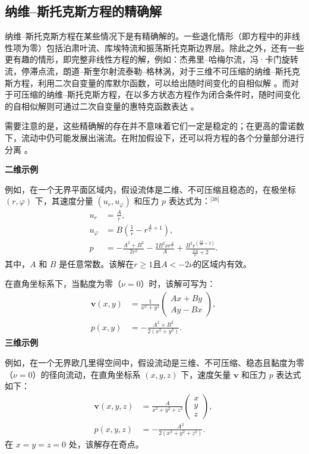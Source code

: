 \subsection{纳维–斯托克斯方程的精确解}
纳维–斯托克斯方程在某些情况下是有精确解的。一些退化情形（即方程中的非线性项为零）包括泊肃叶流、库埃特流和振荡斯托克斯边界层。除此之外，还有一些更有趣的情形，即完整非线性方程的解，例如：杰弗里–哈梅尔流，冯·卡门旋转流，停滞点流，朗道–斯奎尔射流泰勒–格林涡，对于三维不可压缩的纳维–斯托克斯方程，利用二次自变量的库默尔函数，可以给出随时间变化的自相似解 。而对于可压缩的纳维–斯托克斯方程，在以多方状态方程作为闭合条件时，随时间变化的自相似解则可通过二次自变量的惠特克函数表达 。

需要注意的是，这些精确解的存在并不意味着它们一定是稳定的；在更高的雷诺数下，流动中仍可能发展出湍流。在附加假设下，还可以将方程的各个分量部分进行分离 。

\textbf{二维示例}

例如，在一个无界平面区域内，假设流体是二维、不可压缩且稳态的，在极坐标 $(r, \varphi)$ 下，其速度分量 $(u_r, u_\varphi)$ 和压力 $p$ 表达式为：\(^\text{[38]}\)
$$
\begin{aligned}
u_r &= \frac{A}{r}, \\[6pt]
u_\varphi &= B\left(\frac{1}{r} - r^{\frac{A}{\nu} + 1}\right), \\[6pt]
p &= -\frac{A^2 + B^2}{2r^2} - \frac{2B^2 \nu r^{\frac{A}{\nu}}}{A} + \frac{B^2 r^{\left(\frac{2A}{\nu} + 2\right)}}{\frac{2A}{\nu} + 2}.
\end{aligned}~
$$
其中，$A$ 和 $B$ 是任意常数。该解在$r \geq 1$且$A < -2\nu$的区域内有效。

在直角坐标系下，当黏度为零（$\nu = 0$）时，该解可写为：
$$
\begin{aligned}
\mathbf{v}(x, y) &= 
\frac{1}{x^2 + y^2}
\begin{pmatrix}
Ax + By \\
Ay - Bx
\end{pmatrix}, \\[6pt]
p(x, y) &= 
-\frac{A^2 + B^2}{2(x^2 + y^2)}.
\end{aligned}~
$$
\textbf{三维示例}

例如，在一个无界欧几里得空间中，假设流动是三维、不可压缩、稳态且黏度为零（$\nu = 0$）的径向流动，在直角坐标系 $(x, y, z)$ 下，速度矢量 $\mathbf{v}$ 和压力 $p$ 表达式如下：
$$
\begin{aligned}
\mathbf{v}(x, y, z) &= 
\frac{A}{x^2 + y^2 + z^2}
\begin{pmatrix}
x \\
y \\
z
\end{pmatrix}, \\[6pt]
p(x, y, z) &= 
-\frac{A^2}{2(x^2 + y^2 + z^2)}.
\end{aligned}~
$$
在 $x = y = z = 0$ 处，该解存在奇点。

